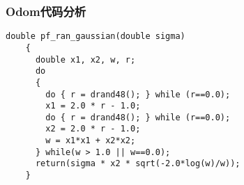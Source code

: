 \begin{frame}[fragile]
  \frametitle{Odom代码分析}
  \label{pf_ran_gaussian}
  \begin{lstlisting}[frame=shadowbox]  
    double pf_ran_gaussian(double sigma)
    {
      double x1, x2, w, r;
      do
      {
        do { r = drand48(); } while (r==0.0);
        x1 = 2.0 * r - 1.0;
        do { r = drand48(); } while (r==0.0);
        x2 = 2.0 * r - 1.0;
        w = x1*x1 + x2*x2;
      } while(w > 1.0 || w==0.0);
      return(sigma * x2 * sqrt(-2.0*log(w)/w));
    }
  \end{lstlisting}
\end{frame}